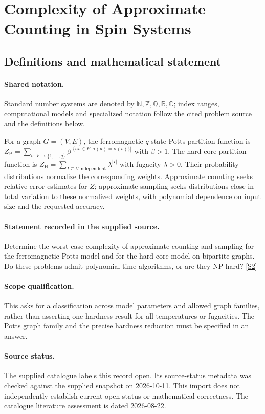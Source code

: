 \documentclass[11pt]{article}
\newcommand{\sref}[2]{\hyperlink{source:#1:#2}{[S#2]}}
\begin{document}
\section{Complexity of Approximate Counting in Spin Systems}\label{statement}

\subsection{Definitions and mathematical statement}

\paragraph{Shared notation.}Standard number systems are denoted by $\mathbb N,\mathbb Z,\mathbb Q,\mathbb R,\mathbb C$; index ranges, computational models and specialized notation follow the cited problem source and the definitions below.


For a graph $G=(V,E)$, the ferromagnetic $q$-state Potts partition function is $Z_{\mathrm P}=\sum_{\sigma:V\to\{1,\ldots,q\}}\beta^{|\{uv\in E:\sigma(u)=\sigma(v)\}|}$ with $\beta>1$. The hard-core partition function is $Z_{\mathrm H}=\sum_{I\subseteq V\,\mathrm{independent}}\lambda^{|I|}$ with fugacity $\lambda>0$. Their probability distributions normalize the corresponding weights. Approximate counting seeks relative-error estimates for $Z$; approximate sampling seeks distributions close in total variation to these normalized weights, with polynomial dependence on input size and the requested accuracy.
\paragraph{Statement recorded in the supplied source.}
Determine the worst-case complexity of approximate counting and sampling for the ferromagnetic Potts model and for the hard-core model on bipartite graphs. Do these problems admit polynomial-time algorithms, or are they NP-hard? \sref{statement}{2}
\paragraph{Scope qualification.}
This asks for a classification across model parameters and allowed graph families, rather than asserting one hardness result for all temperatures or fugacities. The Potts graph family and the precise hardness reduction must be specified in an answer.
\paragraph{Source status.}
The supplied catalogue labels this record open. Its source-status metadata was checked against the supplied snapshot on 2026-10-11. This import does not independently establish current open status or mathematical correctness. The catalogue literature assessment is dated 2026-08-22.
\end{document}
